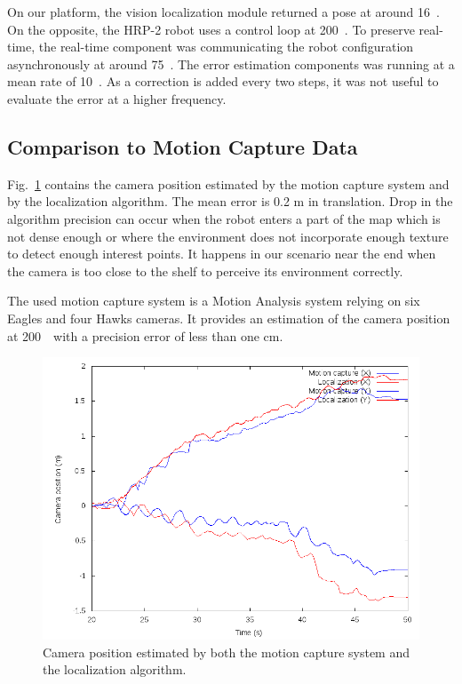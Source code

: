 On our platform, the vision localization module returned a pose at around 16~\hertz. On the opposite, the HRP-2 robot uses a control loop
at 200~\hertz. To preserve real-time, the real-time component was communicating the robot configuration asynchronously at around
75~\hertz. The error estimation components was running at a mean rate of 10~\hertz. As a correction is added every two steps, it was not
useful to evaluate the error at a higher frequency.

\subsection{Comparison to Motion Capture Data}\label{sec:mocap}

Fig.~\ref{tab:mocap_comparison} contains the camera position estimated by the motion capture system and by the localization algorithm. The
mean error is 0.2 m in translation. Drop in the algorithm precision can occur when the robot enters a part of the map which is not dense
enough or where the environment does not incorporate enough texture to detect enough interest points. It happens in our scenario near the end when the camera is too close to the shelf to perceive its environment correctly.

The used motion capture system is a Motion Analysis system relying on six Eagles and four Hawks cameras. It provides an estimation of the
camera position at 200~\hertz~with a precision error of less than one cm.
%
\begin{figure}[ht!]
  \begin{center}
    \includegraphics[width=\linewidth]{data/mocap.png}
  \end{center}
  \caption{Camera position estimated by both the motion capture system
    and the localization algorithm. \label{tab:mocap_comparison}}
\end{figure}
%

